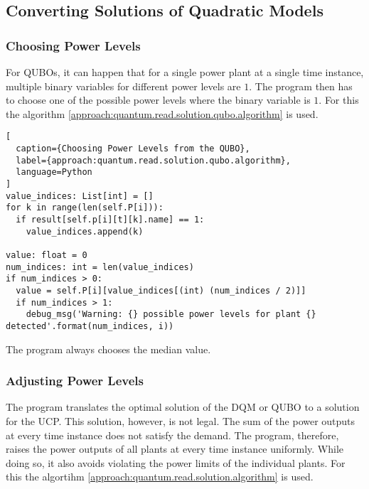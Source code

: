 \subsection{Converting Solutions of Quadratic Models}
\label{approach:quantum.read.solution}

\subsubsection{Choosing Power Levels}

For QUBOs, it can happen that for a single power plant at a single time instance, multiple binary variables for different power levels are $1$.
The program then has to choose one of the possible power levels where the binary variable is $1$.
For this the algorithm \ref{approach:quantum.read.solution.qubo.algorithm} is used.

\begin{lstlisting}[
  caption={Choosing Power Levels from the QUBO},
  label={approach:quantum.read.solution.qubo.algorithm},
  language=Python
]
value_indices: List[int] = []
for k in range(len(self.P[i])):
  if result[self.p[i][t][k].name] == 1:
    value_indices.append(k)

value: float = 0
num_indices: int = len(value_indices)
if num_indices > 0:
  value = self.P[i][value_indices[(int) (num_indices / 2)]]
  if num_indices > 1:
    debug_msg('Warning: {} possible power levels for plant {} detected'.format(num_indices, i))
\end{lstlisting}

The program always chooses the median value.

\subsubsection{Adjusting Power Levels}

The program translates the optimal solution of the DQM or QUBO to a solution for the UCP.
This solution, however, is not legal.
The sum of the power outputs at every time instance does not satisfy the demand.
The program, therefore, raises the power outputs of all plants at every time instance uniformly.
While doing so, it also avoids violating the power limits of the individual plants.
For this the algortihm \ref{approach:quantum.read.solution.algorithm} is used.


